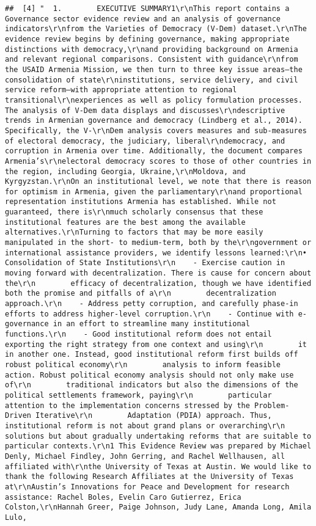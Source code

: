 \documentclass[
]{article}
\begin{document}
\begin{verbatim}
##  [4] "  1.        EXECUTIVE SUMMARY1\r\nThis report contains a Governance sector evidence review and an analysis of governance indicators\r\nfrom the Varieties of Democracy (V-Dem) dataset.\r\nThe evidence review begins by defining governance, making appropriate distinctions with democracy,\r\nand providing background on Armenia and relevant regional comparisons. Consistent with guidance\r\nfrom the USAID Armenia Mission, we then turn to three key issue areas—the consolidation of state\r\ninstitutions, service delivery, and civil service reform—with appropriate attention to regional transitional\r\nexperiences as well as policy formulation processes. The analysis of V-Dem data displays and discusses\r\ndescriptive trends in Armenian governance and democracy (Lindberg et al., 2014). Specifically, the V-\r\nDem analysis covers measures and sub-measures of electoral democracy, the judiciary, liberal\r\ndemocracy, and corruption in Armenia over time. Additionally, the document compares Armenia’s\r\nelectoral democracy scores to those of other countries in the region, including Georgia, Ukraine,\r\nMoldova, and Kyrgyzstan.\r\nOn an institutional level, we note that there is reason for optimism in Armenia, given the parliamentary\r\nand proportional representation institutions Armenia has established. While not guaranteed, there is\r\nmuch scholarly consensus that these institutional features are the best among the available alternatives.\r\nTurning to factors that may be more easily manipulated in the short- to medium-term, both by the\r\ngovernment or international assistance providers, we identify lessons learned:\r\n• Consolidation of State Institutions\r\n    - Exercise caution in moving forward with decentralization. There is cause for concern about the\r\n        efficacy of decentralization, though we have identified both the promise and pitfalls of a\r\n        decentralization approach.\r\n    - Address petty corruption, and carefully phase-in efforts to address higher-level corruption.\r\n    - Continue with e-governance in an effort to streamline many institutional functions.\r\n    - Good institutional reform does not entail exporting the right strategy from one context and using\r\n        it in another one. Instead, good institutional reform first builds off robust political economy\r\n        analysis to inform feasible action. Robust political economy analysis should not only make use of\r\n        traditional indicators but also the dimensions of the political settlements framework, paying\r\n        particular attention to the implementation concerns stressed by the Problem-Driven Iterative\r\n        Adaptation (PDIA) approach. Thus, institutional reform is not about grand plans or overarching\r\n        solutions but about gradually undertaking reforms that are suitable to particular contexts.\r\n1 This Evidence Review was prepared by Michael Denly, Michael Findley, John Gerring, and Rachel Wellhausen, all affiliated with\r\nthe University of Texas at Austin. We would like to thank the following Research Affiliates at the University of Texas at\r\nAustin’s Innovations for Peace and Development for research assistance: Rachel Boles, Evelin Caro Gutierrez, Erica Colston,\r\nHannah Greer, Paige Johnson, Judy Lane, Amanda Long, Amila Lulo, 
\end{verbatim}
\end{document}
